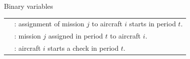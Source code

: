 \begin{frame}[t]
\frametitle{\textbf{\firsttitleF}}
  
  \begin{block}{Binary variables}
    \begin{tabular}{ll}
      \onslide<+->{
        $a^s_{ijt}$ &  : assignment of mission $j$ to aircraft $i$ starts in period $t$.
      }  \\
      \onslide<+->{
        $a_{ijt}$ &  :  mission $j$ assigned in period $t$ to aircraft $i$.
      }  \\
      \onslide<4->{
        $m_{it}$   & :  aircraft $i$ starts a check in period $t$.
      }
    \end{tabular}
  \end{block}

  
\end{frame}

